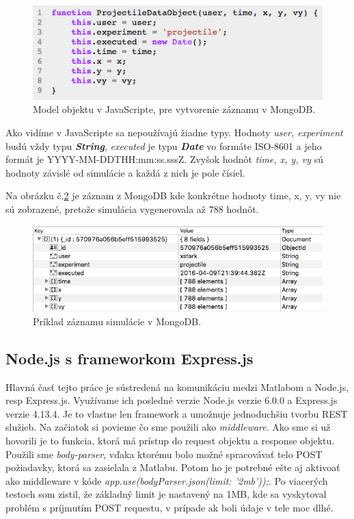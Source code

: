 \begin{figure}[H]
  \centering
  \includegraphics[scale=0.7]{img/code/javascript-projectile-model.png}
  \caption{Model objektu v JavaScripte, pre vytvorenie záznamu v MongoDB.}
  \label{img-js-projectile-model}
\end{figure}

Ako vidíme v JavaScripte sa nepoužívajú žiadne typy. Hodnoty \textit{user, experiment} budú vždy typu \textbf{\textit{String}}, \textit{executed} je typu \textbf{\textit{Date}} vo formáte ISO-8601 a jeho formát je YYYY-MM-DDTHH:mm:ss.sssZ. Zvyšok hodnôt \textit{time, x, y, vy} sú hodnoty závislé od simulácie a každá z nich je pole čísiel.

Na obrázku č.\ref{img-mongo-record} je záznam z MongoDB kde konkrétne hodnoty time, x, y, vy nie sú zobrazené, pretože simulácia vygenerovala až 788 hodnôt.

\begin{figure}[H]
  \centering
  \includegraphics[scale=0.7]{img/code/mongodb-record.png}
  \caption{Príklad záznamu simulácie v MongoDB.}
  \label{img-mongo-record}
\end{figure}


\subsection{Node.js s frameworkom Express.js}
Hlavná časť tejto práce je sústredená na komunikáciu medzi Matlabom a Node.js, resp Express.js. Využívame ich posledné verzie Node.js verzie 6.0.0 a Express.js verzie 4.13.4. Je to vlastne len framework a umožnuje jednoduchšiu tvorbu REST služieb. Na začiatok si povieme čo sme použili ako \textit{middleware}. Ako sme si už hovorili je to funkcia, ktorá má prístup do request objektu a response objektu. Použili sme \textit{body-parser}, vďaka ktorému bolo možné spracovávať telo POST požiadavky, ktorá sa zasielala z Matlabu. Potom ho je potrebné ešte aj aktivoať ako middleware v kóde \textit{app.use(bodyParser.json({limit: '2mb'}));}. Po viacerých testoch som zistil, že základný limit je nastavený na 1MB, kde sa vyskytoval problém s príjmutím POST requestu, v prípade ak boli údaje v tele moc dlhé.

